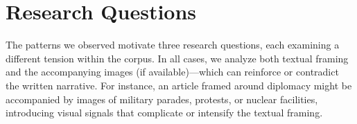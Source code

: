 \documentclass{dhnbpub}
\begin{document}




\section{Research Questions}

The patterns we observed motivate three research questions, each examining a different tension within the corpus. In all cases, we analyze both textual framing and the accompanying images (if available)---which can reinforce or contradict the written narrative. For instance, an article framed around diplomacy might be accompanied by images of military parades, protests, or nuclear facilities, introducing visual signals that complicate or intensify the textual framing.
\end{document}
